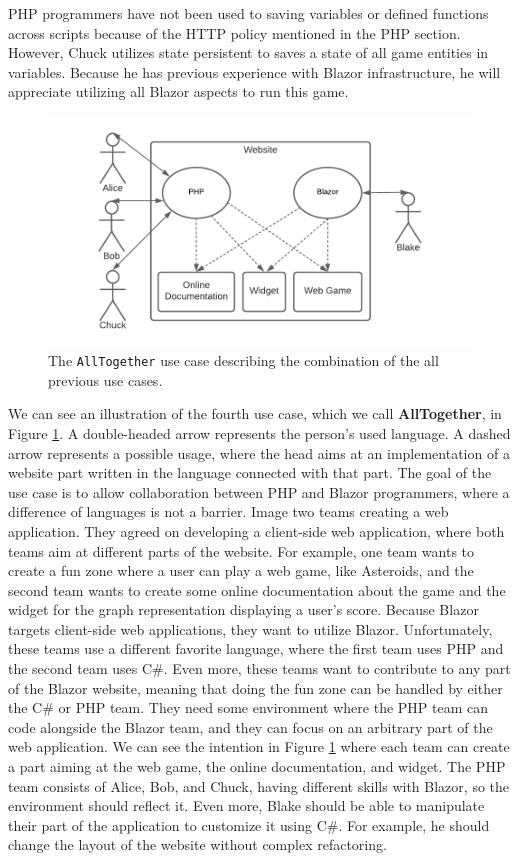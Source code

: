 PHP programmers have not been used to saving variables or defined functions across scripts because of the HTTP policy mentioned in the PHP section.
However, Chuck utilizes state persistent to saves a state of all game entities in variables.
Because he has previous experience with Blazor infrastructure, he will appreciate utilizing all Blazor aspects to run this game.
\par
\begin{figure}
\centering
\includegraphics[scale=0.8]{./img/UseCaseAllTogether}
\caption{The \texttt{AllTogether} use case describing the combination of the all previous use cases. }
\label{img09:usecase}
\end{figure} 
\par
We can see an illustration of the fourth use case, which we call \textbf{AllTogether}, in Figure \ref{img09:usecase}.
A double-headed arrow represents the person's used language. 
A dashed arrow represents a possible usage, where the head aims at an implementation of a website part written in the language connected with that part.
The goal of the use case is to allow collaboration between PHP and Blazor programmers, where a difference of languages is not a barrier.  
Image two teams creating a web application. 
They agreed on developing a client-side web application, where both teams aim at different parts of the website.
For example, one team wants to create a fun zone where a user can play a web game, like Asteroids, and the second team wants to create some online documentation about the game and the widget for the graph representation displaying a user's score.
Because Blazor targets client-side web applications, they want to utilize Blazor.
Unfortunately, these teams use a different favorite language, where the first team uses PHP and the second team uses C\#.
Even more, these teams want to contribute to any part of the Blazor website, meaning that doing the fun zone can be handled by either the C\# or PHP team.
They need some environment where the PHP team can code alongside the Blazor team, and they can focus on an arbitrary part of the web application.
We can see the intention in Figure \ref{img09:usecase} where each team can create a part aiming at the web game, the online documentation, and widget.
The PHP team consists of Alice, Bob, and Chuck, having different skills with Blazor, so the environment should reflect it.
Even more, Blake should be able to manipulate their part of the application to customize it using C\#. For example, he should change the layout of the website without complex refactoring. 

